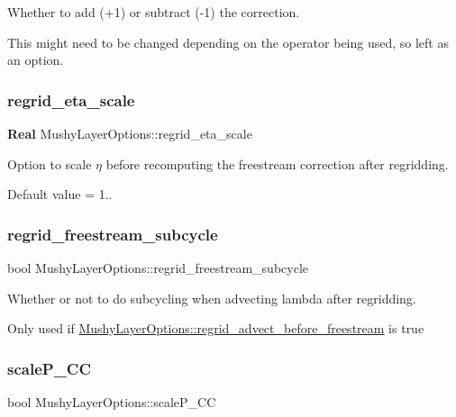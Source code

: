 Whether to add (+1) or subtract (-\/1) the correction. 

This might need to be changed depending on the operator being used, so left as an option. \mbox{\label{struct_mushy_layer_options_a60ecf9ad0f510e7f77233b524cd86dae}} 
\subsubsection{\texorpdfstring{regrid\+\_\+eta\+\_\+scale}{regrid\_eta\_scale}}
{\footnotesize\ttfamily \textbf{ Real} Mushy\+Layer\+Options\+::regrid\+\_\+eta\+\_\+scale}



Option to scale $ \eta $ before recomputing the freestream correction after regridding. 

Default value = 1.. \mbox{\label{struct_mushy_layer_options_aebd1a65fc80b78c57d6b945685cfa742}} 
\subsubsection{\texorpdfstring{regrid\+\_\+freestream\+\_\+subcycle}{regrid\_freestream\_subcycle}}
{\footnotesize\ttfamily bool Mushy\+Layer\+Options\+::regrid\+\_\+freestream\+\_\+subcycle}



Whether or not to do subcycling when advecting lambda after regridding. 

Only used if \hyperlink{struct_mushy_layer_options_a74ed5d4f02c0e0af01281446c30d3d7b}{Mushy\+Layer\+Options\+::regrid\+\_\+advect\+\_\+before\+\_\+freestream} is true \mbox{\label{struct_mushy_layer_options_a862aeef81ad6231eed93035f9640e917}} 
\subsubsection{\texorpdfstring{scale\+P\+\_\+\+CC}{scaleP\_CC}}
{\footnotesize\ttfamily bool Mushy\+Layer\+Options\+::scale\+P\+\_\+\+CC}



